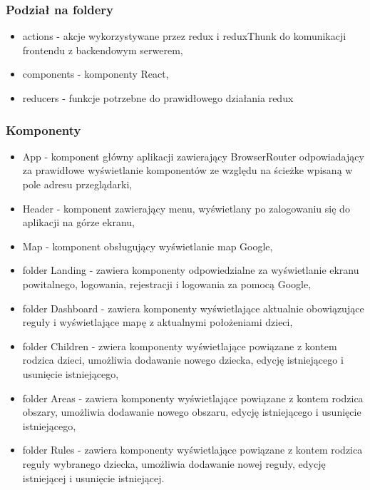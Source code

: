 \documentclass{sprawozdanie-agh}
\begin{document}
			\subsubsection{Podział na foldery}

				\begin{itemize}
					\item actions - akcje wykorzystywane przez redux i reduxThunk do komunikacji frontendu z backendowym serwerem,
					\item components - komponenty React,
					\item reducers - funkcje potrzebne do prawidłowego działania redux
				\end{itemize}

			\subsubsection{Komponenty}

				\begin{itemize}
					\item App - komponent główny aplikacji zawierający BrowserRouter odpowiadający za prawidłowe wyświetlanie komponentów ze względu na ścieżke wpisaną w pole adresu przeglądarki,
					\item Header - komponent zawierający menu, wyświetlany po zalogowaniu się do aplikacji na górze ekranu,
					\item Map - komponent obsługujący wyświetlanie map Google,
					\item folder Landing - zawiera komponenty odpowiedzialne za wyświetlanie ekranu powitalnego, logowania, rejestracji i logowania za pomocą Google,
					\item folder Dashboard - zawiera komponenty wyświetlające aktualnie obowiązujące reguły i wyświetlające mapę z aktualnymi położeniami dzieci,
					\item folder Children - zwiera komponenty wyświetlające powiązane z kontem rodzica dzieci, umożliwia dodawanie nowego dziecka, edycję istniejącego i usunięcie istniejącego,
					\item folder Areas - zawiera komponenty wyświetlające powiązane z kontem rodzica obszary, umożliwia dodawanie nowego obszaru, edycję istniejącego i usunięcie istniejącego,
					\item folder Rules - zawiera komponenty wyświetlające powiązane z kontem rodzica reguły wybranego dziecka, umożliwia dodawanie nowej reguły, edycję istniejącej i usunięcie istniejącej.
				\end{itemize}
\end{document}
